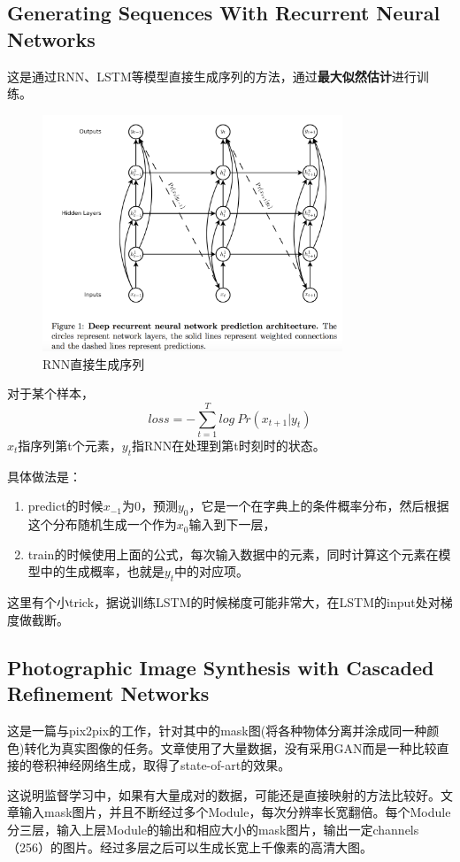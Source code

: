 \documentclass[a4paper]{article}
\begin{document}
\subsection{Generating Sequences With Recurrent Neural Networks\cite{DBLP:journals/corr/Graves13}} 
这是通过RNN、LSTM等模型直接生成序列的方法，通过\textbf{最大似然估计}进行训练。
\begin{figure}
\centering
\includegraphics[width=0.8\textwidth]{./img/3.png}
\caption{RNN直接生成序列}
\label{fig:rnn}
\end{figure}
对于某个样本，$$loss = -\sum\limits_{t=1}^{T} log \ Pr(x_{t+1}|y_t)$$
$x_t$指序列第t个元素，$y_t$指RNN在处理到第t时刻时的状态。

具体做法是：
\begin{enumerate}
\item predict的时候$x_{-1}$为0，预测$y_0$，它是一个在字典上的条件概率分布，然后根据这个分布随机生成一个作为$x_0$输入到下一层，
\item train的时候使用上面的公式，每次输入数据中的元素，同时计算这个元素在模型中的生成概率，也就是$y_t$中的对应项。
\end{enumerate}
这里有个小trick，据说训练LSTM的时候梯度可能非常大，在LSTM的input处对梯度做截断。
\subsection{Photographic Image Synthesis with Cascaded Refinement Networks\cite{chen2017photographic}}
这是一篇与pix2pix的工作，针对其中的mask图(将各种物体分离并涂成同一种颜色)转化为真实图像的任务。文章使用了大量数据，没有采用GAN而是一种比较直接的卷积神经网络生成，取得了state-of-art的效果。

这说明监督学习中，如果有大量成对的数据，可能还是直接映射的方法比较好。文章输入mask图片，并且不断经过多个Module，每次分辨率长宽翻倍。每个Module分三层，输入上层Module的输出和相应大小的mask图片，输出一定channels（256）的图片。经过多层之后可以生成长宽上千像素的高清大图。
\end{document}
